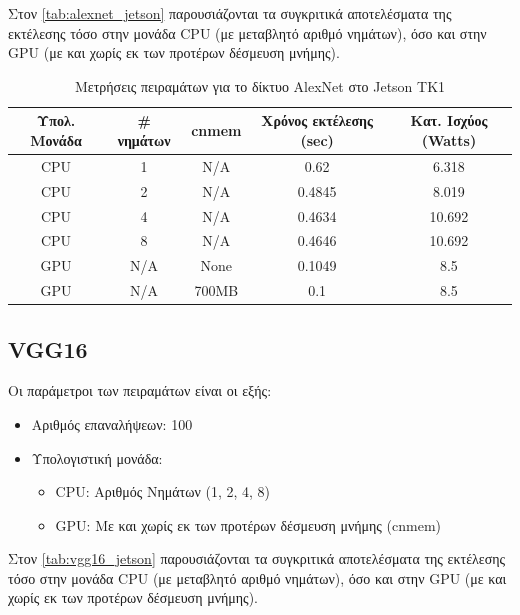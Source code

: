 Στον \autoref{tab:alexnet_jetson} παρουσιάζονται τα συγκριτικά αποτελέσματα της
εκτέλεσης τόσο στην μονάδα CPU (με μεταβλητό αριθμό νημάτων), όσο και στην
GPU (με και χωρίς εκ των προτέρων δέσμευση μνήμης).

\begin{table}[H]
  \begin{center}
    \caption{Μετρήσεις πειραμάτων για το δίκτυο AlexNet στο Jetson TK1}
    \label{tab:alexnet_jetson}
    \small
    \begin{tabular}[center]{ | c | c | c | c | c | }
      \hline
      \rowcolor{Gray}
      Υπολ. Μονάδα & \# νημάτων & cnmem & Χρόνος εκτέλεσης (sec) & Κατ. Ισχύος (Watts) \\
      \hline
      CPU & 1 & N/A & 0.62 & 6.318\\
      CPU & 2 & N/A & 0.4845 & 8.019\\
      CPU & 4 & N/A & 0.4634 & 10.692\\
      CPU & 8 & N/A & 0.4646 & 10.692\\
      GPU & N/A & None & 0.1049 & 8.5\\
      GPU & N/A & 700MB & 0.1 & 8.5\\
      \hline
    \end{tabular}
  \end{center}
\end{table}



\subsection{VGG16}

Οι παράμετροι των πειραμάτων είναι οι εξής:
\begin{itemize}
  \item{Αριθμός επαναλήψεων: 100}
  \item{Υπολογιστική μονάδα:}
    \begin{itemize}
      \item{CPU: Αριθμός Νημάτων (1, 2, 4, 8)}
      \item{GPU: Με και χωρίς εκ των προτέρων δέσμευση μνήμης (cnmem)}
    \end{itemize}
\end{itemize}

Στον \autoref{tab:vgg16_jetson} παρουσιάζονται τα συγκριτικά αποτελέσματα της
εκτέλεσης τόσο στην μονάδα CPU (με μεταβλητό αριθμό νημάτων), όσο και στην
GPU (με και χωρίς εκ των προτέρων δέσμευση μνήμης).

